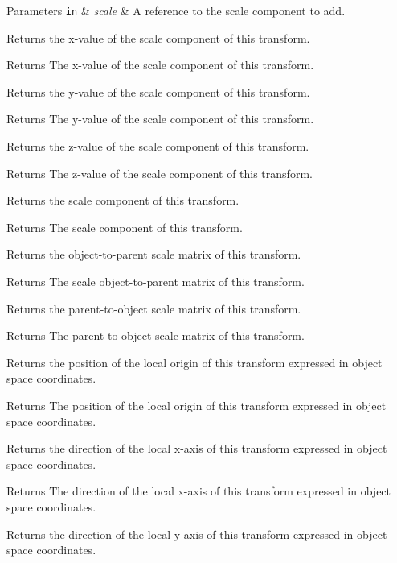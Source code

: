 \begin{DoxyParams}[1]{Parameters}
\mbox{\tt in}  & {\em scale} & A reference to the scale component to add.\\
\hline
\end{DoxyParams}
Returns the x-\/value of the scale component of this transform.

\begin{DoxyReturn}{Returns}
The x-\/value of the scale component of this transform.
\end{DoxyReturn}
Returns the y-\/value of the scale component of this transform.

\begin{DoxyReturn}{Returns}
The y-\/value of the scale component of this transform.
\end{DoxyReturn}
Returns the z-\/value of the scale component of this transform.

\begin{DoxyReturn}{Returns}
The z-\/value of the scale component of this transform.
\end{DoxyReturn}
Returns the scale component of this transform.

\begin{DoxyReturn}{Returns}
The scale component of this transform.
\end{DoxyReturn}
Returns the object-\/to-\/parent scale matrix of this transform.

\begin{DoxyReturn}{Returns}
The scale object-\/to-\/parent matrix of this transform.
\end{DoxyReturn}
Returns the parent-\/to-\/object scale matrix of this transform.

\begin{DoxyReturn}{Returns}
The parent-\/to-\/object scale matrix of this transform.
\end{DoxyReturn}
Returns the position of the local origin of this transform expressed in object space coordinates.

\begin{DoxyReturn}{Returns}
The position of the local origin of this transform expressed in object space coordinates.
\end{DoxyReturn}
Returns the direction of the local x-\/axis of this transform expressed in object space coordinates.

\begin{DoxyReturn}{Returns}
The direction of the local x-\/axis of this transform expressed in object space coordinates.
\end{DoxyReturn}
Returns the direction of the local y-\/axis of this transform expressed in object space coordinates.

